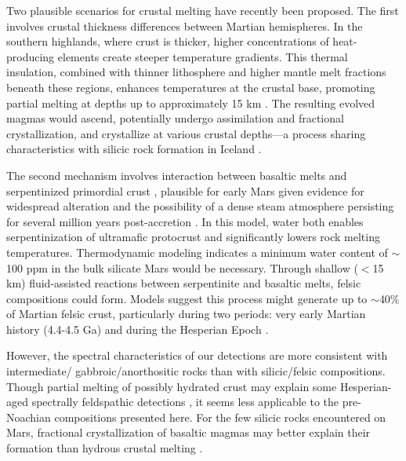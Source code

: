 \documentclass[12pt]{article}
\begin{document}
Two plausible scenarios for crustal melting have recently been proposed. The first involves crustal thickness differences between Martian hemispheres. In the southern highlands, where crust is thicker, higher concentrations of heat-producing elements create steeper temperature gradients. This thermal insulation, combined with thinner lithosphere and higher mantle melt fractions beneath these regions, enhances temperatures at the crustal base, promoting partial melting at depths up to approximately 15 km \citep{BonnetGibet2022, BonnetGibet2025}. The resulting evolved magmas would ascend, potentially undergo assimilation and fractional crystallization, and crystallize at various crustal depths---a process sharing characteristics with silicic rock formation in Iceland \citep{Jonasson2007, Martin2007, Martin2010}.

The second mechanism involves interaction between basaltic melts and serpentinized primordial crust \citep{Bernadet2025}, plausible for early Mars given evidence for widespread alteration \citep{Bibring2006, Bishop2008, Ehlmann2009, Ehlmann2014, Wordsworth2017, Viviano2023, Carter2023, Royer2024} and the possibility of a dense steam atmosphere persisting for several million years post-accretion \citep{Abe2011, Scherf2020}. In this model, water both enables serpentinization of ultramafic protocrust and significantly lowers rock melting temperatures. Thermodynamic modeling indicates a minimum water content of $\sim$100 ppm in the bulk silicate Mars would be necessary. Through shallow ($<$15 km) fluid-assisted reactions between serpentinite and basaltic melts, felsic compositions could form. Models suggest this process might generate up to $\sim$40\% of Martian felsic crust, particularly during two periods: very early Martian history (4.4-4.5 Ga) and during the Hesperian Epoch \citep{Bernadet2025}.

However, the spectral characteristics of our detections are more consistent with intermediate/ gabbroic/anorthositic rocks than with silicic/felsic compositions. Though partial melting of possibly hydrated crust may explain some Hesperian-aged spectrally feldspathic detections \citep{Farrand2021, Rogers2022, Michalski2023}, it seems less applicable to the pre-Noachian compositions presented here. For the few silicic rocks encountered on Mars, fractional crystallization of basaltic magmas may better explain their formation than hydrous crustal melting \citep{Udry2018}.
\end{document}
